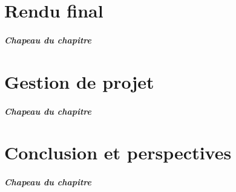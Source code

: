\documentclass[12pt, french]{report}
\begin{document}
\chapter{Rendu final}
\paragraph{Chapeau du chapitre}

\clearpage

\chapter{Gestion de projet}
\paragraph{Chapeau du chapitre}

\clearpage

\chapter{Conclusion et perspectives}
\paragraph{Chapeau du chapitre}

\clearpage



\clearpage


\clearpage
\end{document}
